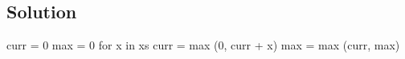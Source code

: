 \subsection*{Solution}

curr = 0
max = 0
for x in xs
  curr = max (0, curr + x)
  max  = max (curr, max)
